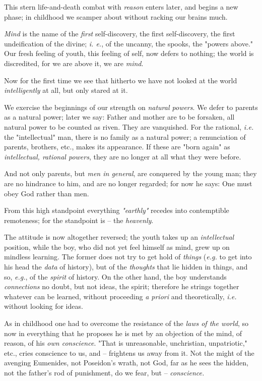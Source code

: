 \documentclass[a4paper]{book}
\begin{document}
This stern life-and-death combat with \textit{reason} enters later, and begins 
a new phase; in childhood we scamper about without racking our brains much.

\textit{Mind} is the name of the \textit{first} self-discovery, the first 
self-discovery, the first undeification of the divine; \textit{i. e.}, of the 
uncanny, the spooks, the "{}powers above."{} Our fresh feeling of youth, this 
feeling of self, now defers to nothing; the world is discredited, for we are 
above it, we are \textit{mind}.

Now for the first time we see that hitherto we have not looked at the world 
\textit{intelligently} at all, but only stared at it.

We exercise the beginnings of our strength on \textit{natural powers}. We 
defer to parents as a natural power; later we say: Father and mother are to be 
forsaken, all natural power to be counted as riven. They are vanquished. For 
the rational, \textit{i.e.} the "{}intellectual"{} man, there is no family as 
a natural power; a renunciation of parents, brothers, etc., makes its 
appearance. If these are "{}born again"{} as \textit{intellectual, rational 
powers}, they are no longer at all what they were before.

And not only parents, but \textit{men in general}, are conquered by the young 
man; they are no hindrance to him, and are no longer regarded; for now he 
says: One must obey God rather than men.

From this high standpoint everything \textit{"{}earthly"{}} recedes into 
contemptible remoteness; for the standpoint is -- the \textit{heavenly}.

The attitude is now altogether reversed; the youth takes up an 
\textit{intellectual} position, while the boy, who did not yet feel himself as 
mind, grew up on mindless learning. The former does not try to get hold of 
\textit{things} (\textit{e.g.} to get into his head the \textit{data} of 
history), but of the \textit{thoughts} that lie hidden in things, and so, 
\textit{e.g.}, of the \textit{spirit} of history. On the other hand, the boy 
understands \textit{connections} no doubt, but not ideas, the spirit; 
therefore he strings together whatever can be learned, without proceeding 
\textit{a priori} and theoretically, \textit{i.e.} without looking for ideas.

As in childhood one had to overcome the resistance of the \textit{laws of the 
world}, so now in everything that he proposes he is met by an objection of the 
mind, of reason, of his \textit{own conscience}. "{}That is unreasonable, 
unchristian, unpatriotic,"{} etc., cries conscience to us, and -- frightens us 
away from it. Not the might of the avenging Eumenides, not Poseidon's wrath, 
not God, far as he sees the hidden, not the father's rod of punishment, do we 
fear, but -- \textit{conscience.}
\end{document}
